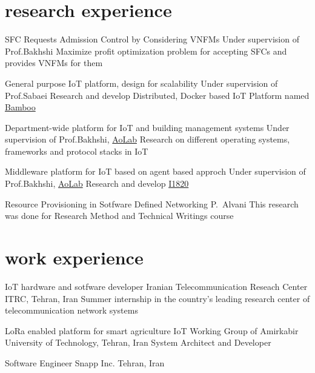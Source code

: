 \documentclass[]{friggeri-cv} %
\begin{document}

\section{research experience}

\begin{entrylist}
  {SFC Requests Admission Control by Considering VNFMs}
  {Under supervision of Prof.Bakhshi}
  {Maximize profit optimization problem for accepting SFCs and provides VNFMs for them}

  {General purpose IoT platform, design for scalability}
  {Under supervision of Prof.Sabaei}
  {Research and develop Distributed, Docker based IoT Platform named \href{https://github.com/bambil/bamboo}{Bamboo}}

  {Department-wide platform for IoT and building management systems}
  {Under supervision of Prof.Bakhshi, \href{https://aolab.github.io/}{AoLab}}
  {Research on different operating systems, frameworks and protocol stacks in IoT}

  {Middleware platform for IoT based on agent based approch}
  {Under supervision of Prof.Bakhshi, \href{https://aolab.github.io/}{AoLab}}
  {Research and develop \href{https://I1820.github.io}{I1820}}

  {Resource Provisioning in Sotfware Defined Networking}
  {P.\ Alvani}
  {This research was done for Research Method and Technical Writings course}

\end{entrylist}


\section{work experience}

\begin{entrylist}

  {IoT hardware and sotfware developer}
  {Iranian Telecommunication Reseach Center ITRC, Tehran, Iran}
  {Summer internship in the country's leading research center of telecommunication network systems}

  {LoRa enabled platform for smart agriculture}
  {IoT Working Group of Amirkabir University of Technology, Tehran, Iran}
  {System Architect and Developer}


  {Software Engineer}
  {Snapp Inc. Tehran, Iran}
  {}


\end{entrylist}
\end{document}
